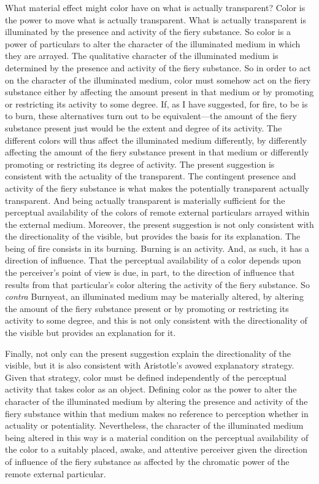 What material effect might color have on what is actually transparent? Color is the power to move what is actually transparent. What is actually transparent is illuminated by the presence and activity of the fiery substance. So color is a power of particulars to alter the character of the illuminated medium in which they are arrayed. The qualitative character of the illuminated medium is determined by the presence and activity of the fiery substance. So in order to act on the character of the illuminated medium, color must somehow act on the fiery substance either by affecting the amount present in that medium or by promoting or restricting its activity to some degree. If, as I have suggested, for fire, to be is to burn, these alternatives turn out to be equivalent---the amount of the fiery substance present just would be the extent and degree of its activity. The different colors will thus affect the illuminated medium differently, by differently affecting the amount of the fiery substance present in that medium or differently promoting or restricting its degree of activity. The present suggestion is consistent with the actuality of the transparent. The contingent presence and activity of the fiery substance is what makes the potentially transparent actually transparent. And being actually transparent is materially sufficient for the perceptual availability of the colors of remote external particulars arrayed within the external medium. Moreover, the present suggestion is not only consistent with the directionality of the visible, but provides the basis for its explanation. The being of fire consists in its burning. Burning is an activity. And, as such, it has a direction of influence. That the perceptual availability of a color depends upon the perceiver's point of view is due, in part, to the direction of influence that results from that particular's color altering the activity of the fiery substance. So \emph{contra} Burnyeat, an illuminated medium may be materially altered, by altering the amount of the fiery substance present or by promoting or restricting its activity to some degree, and this is not only consistent with the directionality of the visible but provides an explanation for it.

Finally, not only can the present suggestion explain the directionality of the visible, but it is also consistent with Aristotle's avowed explanatory strategy. Given that strategy, color must be defined independently of the perceptual activity that takes color as an object. Defining color as the power to alter the character of the illuminated medium by altering the presence and activity of the fiery substance within that medium makes no reference to perception whether in actuality or potentiality. Nevertheless, the character of the illuminated medium being altered in this way is a material condition on the perceptual availability of the color to a suitably placed, awake, and attentive perceiver given the direction of influence of the fiery substance as affected by the chromatic power of the remote external particular.

